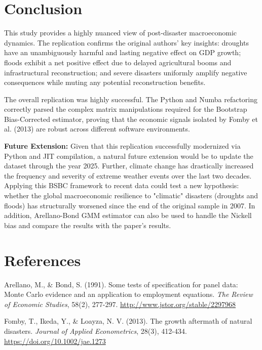 \documentclass[11pt, a4paper]{article}
\begin{document}
\section{Conclusion}

This study provides a highly nuanced view of post-disaster macroeconomic dynamics. The replication confirms the original authors' key insights: droughts have an unambiguously harmful and lasting negative effect on GDP growth; floods exhibit a net positive effect due to delayed agricultural booms and infrastructural reconstruction; and severe disasters uniformly amplify negative consequences while muting any potential reconstruction benefits. 

The overall replication was highly successful. The Python and Numba refactoring correctly parsed the complex matrix manipulations required for the Bootstrap Bias-Corrected estimator, proving that the economic signals isolated by Fomby et al. (2013) are robust across different software environments. 

\textbf{Future Extension:} Given that this replication successfully modernized via Python and JIT compilation, a natural future extension would be to update the dataset through the year 2025. Further, climate change has drastically increased the frequency and severity of extreme weather events over the last two decades. Applying this BSBC framework to recent data could test a new hypothesis: whether the global macroeconomic resilience to "climatic" disasters (droughts and floods) has structurally worsened since the end of the original sample in 2007. In addition, Arellano-Bond GMM estimator can also be used to handle the Nickell bias and compare the results with the paper's results.

\section*{References}
\begin{description}
    \item Arellano, M., \& Bond, S. (1991). Some tests of specification for panel data: Monte Carlo evidence and an application to employment equations. \textit{The Review of Economic Studies}, 58(2), 277-297. \url{http://www.jstor.org/stable/2297968}
    \item Fomby, T., Ikeda, Y., \& Loayza, N. V. (2013). The growth aftermath of natural disasters. \textit{Journal of Applied Econometrics}, 28(3), 412-434. \url{https://doi.org/10.1002/jae.1273}
\end{description}
\end{document}
